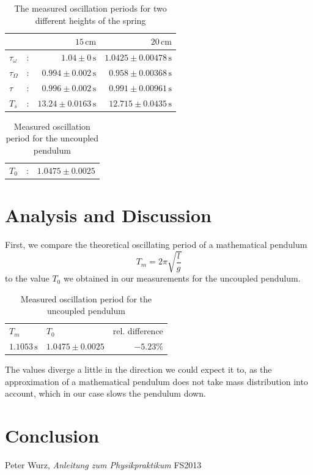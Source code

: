 \documentclass{scrreprt}
\newcommand{\unit}[1]{\ensuremath{\, \mathrm{#1}}}
\begin{document}
\begin{table}[H]
\centering
	\begin{tabular}{lcrr}
	&&$15\unit{cm}$&$20\unit{cm}$\\
	\hline	
	$\tau_\omega$&:&$1.04\pm 0 \unit{s}$&$1.0425\pm 0.00478\unit{s}$\\	
	$\tau_\Omega$&:&$0.994\pm 0.002 \unit{s}$&$0.958\pm 0.00368\unit{s}$\\
	$\tau$&:&$0.996\pm 0.002 \unit{s}$&$0.991\pm 0.00961\unit{s}$\\
	$T_s$&:&$13.24\pm 0.0163 \unit{s}$&$12.715\pm 0.0435\unit{s}$\\
	\end{tabular}
	\caption{The measured oscillation periods for two different heights of the spring}
\end{table}
\begin{table}[H]
	\centering
	\begin{tabular}{lcr}
		$T_0$&:&$1.0475	\pm 0.0025$
	\end{tabular}
	\caption{Measured oscillation period for the uncoupled pendulum}
\end{table}

\section{Analysis and Discussion}
First, we compare the theoretical oscillating period of a mathematical pendulum 
\begin{equation}
	T_m=2\pi\sqrt{\frac{l}{g}}
\end{equation}
to the value $T_0$ we obtained in our measurements for the uncoupled pendulum.
\begin{table}[H]
	\centering
	\begin{tabular}{llr}
		$T_m$&$T_0$&rel. difference\\
		$1.1053 \unit{s}$&$1.0475 \pm 0.0025$ & $-5.23\%$
	\end{tabular}
	\caption{Measured oscillation period for the uncoupled pendulum}
\end{table}
The values diverge a little in the direction we could expect it to, as the approximation of a mathematical pendulum does not take mass distribution into account, which in our case slows the pendulum down.



\section{Conclusion}

\begin{thebibliography}{9}

  Peter Wurz,
  \emph{Anleitung zum Physikpraktikum}
  FS2013

\end{thebibliography}
\end{document}
